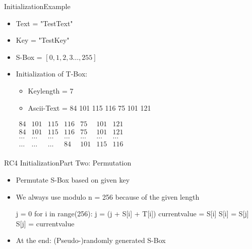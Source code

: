 \documentclass[
	aspectratio=169,	%
	onlytextwidth,		%
	t,					%
	]{beamer}
\begin{document}
\begin{frame}{Initialization}{Example}
	\begin{itemize}
		\item Text = "TestText"
		\item Key = "TestKey"
		\item S-Box = $[0, 1, 2, 3 \dots, 255]$
		\item Initialization of T-Box:
		\begin{itemize}
			\item Keylength = 7
			\item Ascii-Text = 84 101 115 116 75 101 121
		\end{itemize}
		\medskip
		$\begin{array}{|ccccccc|}
		84 & 101 & 115 & 116 & 75 & 101 & 121 \\
		84 & 101 & 115 & 116 & 75 & 101 & 121 \\
		\dots & \dots & \dots & \dots & \dots & \dots & \dots \\
		\dots & \dots & \dots & 84 & 101 & 115 & 116 \\
		\end{array}$
	\end{itemize}
\end{frame}


\begin{frame}[fragile]{RC4 Initialization}{Part Two: Permutation}
	\begin{itemize}
		\item Permutate S-Box based on given key
		\item We always use modulo n = 256 because of the given length

		\begin{python}
			j = 0
			for i in range(256):
				j = (j + S[i] + T[i]) %
				currentvalue = S[i]
				S[i] = S[j]
				S[j] = currentvalue
		\end{python}
		\item At the end: (Pseudo-)randomly generated S-Box
		
	\end{itemize}
\end{frame}
\end{document}
